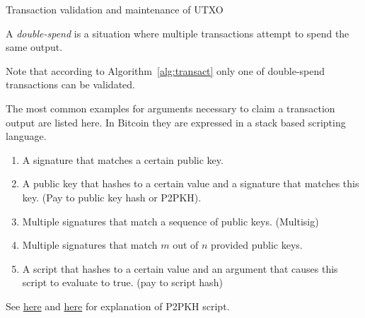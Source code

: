 \begin{algorithm}[h!]
	\caption{Transaction validation and maintenance of UTXO}
	\label{alg:transact}
	\begin{algorithmic}
				\EndIf
				\EndIf
			\EndFor
			\EndIf
			
				 
			\EndFor
			
			
		\EndProcedure
	\end{algorithmic}
\end{algorithm}


\begin{definition}
A \emph{double-spend} is a situation where multiple transactions attempt to spend the same output. 	
\end{definition}
\begin{note}
Note that according to Algorithm~\ref{alg:transact} only one of double-spend transactions can be validated. 
\end{note}

\pagebreak


\begin{example}
	\label{ex:P2PKH}
	The most common examples for arguments necessary to claim a transaction output are listed here. In Bitcoin they are expressed in a stack based scripting language.
	\begin{enumerate}[label=\alph*)]
		\item A signature that matches a certain public key.
		\item A public key that hashes to a certain value and a signature that matches this key. (Pay to public key hash or P2PKH).
		\item Multiple signatures that match a sequence of public keys. (Multisig)
		\item Multiple signatures that match $m$ out of $n$ provided public keys.
		\item A script that hashes to a certain value and an argument that causes this script to evaluate to true. (pay to script hash)
	\end{enumerate}
	See \href{https://github.com/bitcoinbook/bitcoinbook/blob/develop/ch06.asciidoc#P2PubKHash1}{here} and \href{https://github.com/bitcoinbook/bitcoinbook/blob/develop/ch06.asciidoc#scriptSig_and_scriptPubKey}{here} for explanation of P2PKH script.
\end{example}

